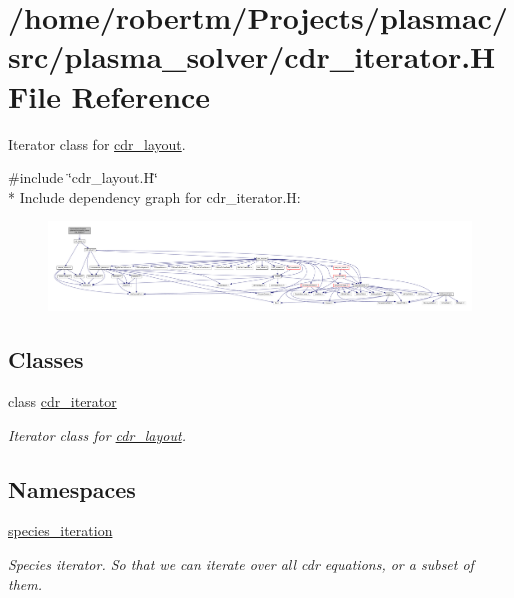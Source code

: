 \hypertarget{cdr__iterator_8H}{}\section{/home/robertm/\+Projects/plasmac/src/plasma\+\_\+solver/cdr\+\_\+iterator.H File Reference}
\label{cdr__iterator_8H}


Iterator class for \hyperlink{classcdr__layout}{cdr\+\_\+layout}.  


{\ttfamily \#include \char`\"{}cdr\+\_\+layout.\+H\char`\"{}}\\*
Include dependency graph for cdr\+\_\+iterator.\+H\+:\nopagebreak
\begin{figure}[H]
\begin{center}
\leavevmode
\includegraphics[width=350pt]{cdr__iterator_8H__incl}
\end{center}
\end{figure}
\subsection*{Classes}
\begin{DoxyCompactItemize}
\item 
class \hyperlink{classcdr__iterator}{cdr\+\_\+iterator}
\begin{DoxyCompactList}\small\item\em Iterator class for \hyperlink{classcdr__layout}{cdr\+\_\+layout}. \end{DoxyCompactList}\end{DoxyCompactItemize}
\subsection*{Namespaces}
\begin{DoxyCompactItemize}
\item 
 \hyperlink{namespacespecies__iteration}{species\+\_\+iteration}
\begin{DoxyCompactList}\small\item\em Species iterator. So that we can iterate over all cdr equations, or a subset of them. \end{DoxyCompactList}\end{DoxyCompactItemize}

